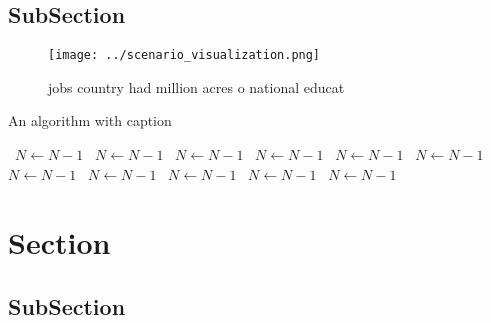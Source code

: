 \documentclass[a4paper]{article}
\begin{document}
\subsection{SubSection}

\begin{figure}
\centering
\texttt{[image: ../scenario\_visualization.png]}
\caption{ jobs country had million acres o national educat
}
\end{figure}
 
\begin{algorithm}
\caption{An algorithm with caption}
\begin{algorithmic}
\    \State $N \gets N - 1$
\    \State $N \gets N - 1$
\    \State $N \gets N - 1$
\    \State $N \gets N - 1$
\    \State $N \gets N - 1$
\    \State $N \gets N - 1$
\    \State $N \gets N - 1$
\    \State $N \gets N - 1$
\    \State $N \gets N - 1$
\    \State $N \gets N - 1$
\    \State $N \gets N - 1$
\EndWhile
\end{algorithmic}
\end{algorithm}

\section{Section}

\subsection{SubSection}
\end{document}
